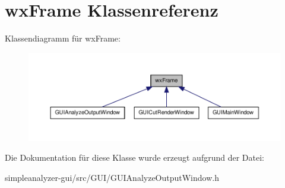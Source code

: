 \hypertarget{classwxFrame}{\section{wx\-Frame Klassenreferenz}
\label{classwxFrame}
}


Klassendiagramm für wx\-Frame\-:
\nopagebreak
\begin{figure}[H]
\begin{center}
\leavevmode
\includegraphics[width=350pt]{classwxFrame__inherit__graph}
\end{center}
\end{figure}


Die Dokumentation für diese Klasse wurde erzeugt aufgrund der Datei\-:\begin{DoxyCompactItemize}
\item 
simpleanalyzer-\/gui/src/\-G\-U\-I/G\-U\-I\-Analyze\-Output\-Window.\-h\end{DoxyCompactItemize}
